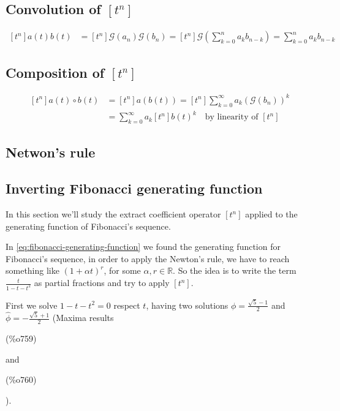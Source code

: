 \subsection{Convolution of $[t^{n}] $}
\begin{displaymath}
  \begin{split}
    [t^{n}] a(t)b(t) &= [t^{n}] \mathcal{G} (a_n) \mathcal{G} (b_n) =
    [t^{n}]\mathcal{G} \left(\sum_{k=0}^{n}{a_k b_{n-k}} \right) =
    \sum_{k=0}^{n}{a_k b_{n-k}}
  \end{split}
\end{displaymath}

\subsection{Composition of $[t^{n}] $}
\begin{displaymath}
  \begin{split}
    [t^{n}] a(t)\circ b(t) &=[t^{n}] a(b(t))
    =[t^{n}]\sum_{k=0}^{\infty}{a_k (\mathcal{G} (b_n))^k}\\
    &=\sum_{k=0}^{\infty}{a_k [t^{n}] b(t)^k} \quad \text{by linearity
      of } [t^n]
  \end{split}
\end{displaymath}

\subsection{Netwon's rule}

\subsection{Inverting Fibonacci generating function}
In this section we'll study the extract coefficient operator $[t^{n}]$
applied to the generating function of Fibonacci's sequence.

In \autoref{eq:fibonacci-generating-function} we found the generating
function for Fibonacci's sequence, in order to apply the Newton's
rule, we have to reach something like $(1 + \alpha t)^r$, for some
$\alpha, r \in \mathbb{R} $. So the idea is to write the term
$\frac{t}{1-t-t^2}$ as partial fractions and try to apply $[t^{n}]$.

First we solve $1-t-t^2 = 0$ respect $t$, having two solutions
$\phi=\frac{\sqrt{5}-1}{2}$ and $\hat{\phi}=-\frac{\sqrt{5}+1}{2}$
(Maxima results \parbox{8ex}{\color{labelcolor}(\%o759) }
and \parbox{8ex}{\color{labelcolor}(\%o760) }).

